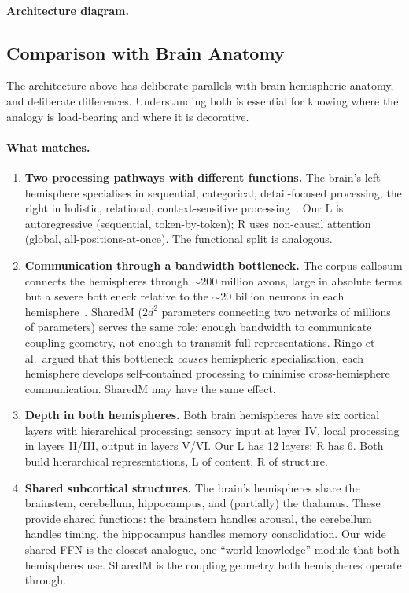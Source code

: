 \documentclass[11pt, a4paper]{article}
\theoremstyle{plain}
\theoremstyle{definition}
\theoremstyle{remark}
\begin{document}
\paragraph{Architecture diagram.}




\subsection{Comparison with Brain Anatomy}
\label{sec:brain-anatomy}

The architecture above has deliberate parallels with brain hemispheric anatomy, and deliberate differences.
Understanding both is essential for knowing where the analogy is load-bearing and where it is decorative.

\paragraph{What matches.}

\begin{enumerate}[nosep]
\item \textbf{Two processing pathways with different functions.}
The brain's left hemisphere specialises in sequential, categorical, detail-focused processing; the right in holistic, relational, context-sensitive processing~\cite{mcgilchrist2021matter}.
Our L is autoregressive (sequential, token-by-token); R uses non-causal attention (global, all-positions-at-once).
The functional split is analogous.

\item \textbf{Communication through a bandwidth bottleneck.}
The corpus callosum connects the hemispheres through $\sim$200 million axons, large in absolute terms but a severe bottleneck relative to the $\sim$20 billion neurons in each hemisphere~\cite{ringo1994hemispheric}.
SharedM ($2d^2$ parameters connecting two networks of millions of parameters) serves the same role: enough bandwidth to communicate coupling geometry, not enough to transmit full representations.
Ringo et al.\ argued that this bottleneck \emph{causes} hemispheric specialisation, each hemisphere develops self-contained processing to minimise cross-hemisphere communication.
SharedM may have the same effect.

\item \textbf{Depth in both hemispheres.}
Both brain hemispheres have six cortical layers with hierarchical processing: sensory input at layer IV, local processing in layers II/III, output in layers V/VI.
Our L has 12 layers; R has 6.
Both build hierarchical representations, L of content, R of structure.

\item \textbf{Shared subcortical structures.}
The brain's hemispheres share the brainstem, cerebellum, hippocampus, and (partially) the thalamus.
These provide shared functions: the brainstem handles arousal, the cerebellum handles timing, the hippocampus handles memory consolidation.
Our wide shared FFN is the closest analogue, one ``world knowledge'' module that both hemispheres use.
SharedM is the coupling geometry both hemispheres operate through.
\end{enumerate}
\end{document}
